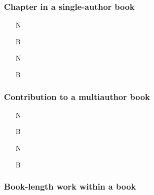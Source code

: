 \documentclass[11pt,letterpaper,oneside]{article}
\begin{document}



\setcounter{subsubsection}{110}
\subsubsection{Chapter in a single-author book}

\begin{itemize}
\item[N] 

\item[B] 

\item[N] 

\item[B] 
\end{itemize}

\subsubsection{Contribution to a multiauthor book}
\label{14.112}

\begin{itemize}
\item[N] 

\item[B] 

\item[N] 

\item[B] 
\end{itemize}

\setcounter{subsubsection}{113}
\subsubsection{Book-length work within a book}
\end{document}

